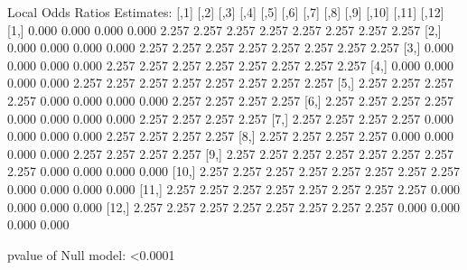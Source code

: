\documentclass[article,shortnames,nojss]{jss}
\begin{document}
\begin{Schunk}
\begin{Soutput}
Local Odds Ratios Estimates:
       [,1]  [,2]  [,3]  [,4]  [,5]  [,6]  [,7]  [,8]  [,9] [,10] [,11] [,12]
 [1,] 0.000 0.000 0.000 0.000 2.257 2.257 2.257 2.257 2.257 2.257 2.257 2.257
 [2,] 0.000 0.000 0.000 0.000 2.257 2.257 2.257 2.257 2.257 2.257 2.257 2.257
 [3,] 0.000 0.000 0.000 0.000 2.257 2.257 2.257 2.257 2.257 2.257 2.257 2.257
 [4,] 0.000 0.000 0.000 0.000 2.257 2.257 2.257 2.257 2.257 2.257 2.257 2.257
 [5,] 2.257 2.257 2.257 2.257 0.000 0.000 0.000 0.000 2.257 2.257 2.257 2.257
 [6,] 2.257 2.257 2.257 2.257 0.000 0.000 0.000 0.000 2.257 2.257 2.257 2.257
 [7,] 2.257 2.257 2.257 2.257 0.000 0.000 0.000 0.000 2.257 2.257 2.257 2.257
 [8,] 2.257 2.257 2.257 2.257 0.000 0.000 0.000 0.000 2.257 2.257 2.257 2.257
 [9,] 2.257 2.257 2.257 2.257 2.257 2.257 2.257 2.257 0.000 0.000 0.000 0.000
[10,] 2.257 2.257 2.257 2.257 2.257 2.257 2.257 2.257 0.000 0.000 0.000 0.000
[11,] 2.257 2.257 2.257 2.257 2.257 2.257 2.257 2.257 0.000 0.000 0.000 0.000
[12,] 2.257 2.257 2.257 2.257 2.257 2.257 2.257 2.257 0.000 0.000 0.000 0.000

pvalue of Null model: <0.0001 
\end{Soutput}
\end{Schunk}
\end{document}
